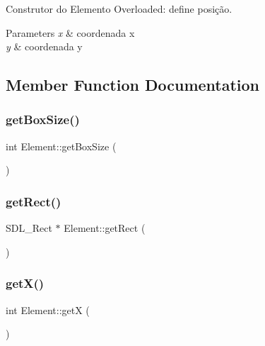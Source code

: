 Construtor do Elemento Overloaded\+: define posição. 


\begin{DoxyParams}{Parameters}
{\em x} & coordenada x \\
\hline
{\em y} & coordenada y \\
\hline
\end{DoxyParams}


\subsection{Member Function Documentation}
\mbox{\label{classElement_a9bb602a1a56055ea4b360b1a5486ff24}} 
\subsubsection{\texorpdfstring{get\+Box\+Size()}{getBoxSize()}}
{\footnotesize\ttfamily int Element\+::get\+Box\+Size (\begin{DoxyParamCaption}{ }\end{DoxyParamCaption})}

\mbox{\label{classElement_ac8e7a2a1670e95335b6924b873600ea3}} 
\subsubsection{\texorpdfstring{get\+Rect()}{getRect()}}
{\footnotesize\ttfamily S\+D\+L\+\_\+\+Rect $\ast$ Element\+::get\+Rect (\begin{DoxyParamCaption}{ }\end{DoxyParamCaption})}

\mbox{\label{classElement_ab5e2530eac11f0281769e6689856ceb2}} 
\subsubsection{\texorpdfstring{get\+X()}{getX()}}
{\footnotesize\ttfamily int Element\+::getX (\begin{DoxyParamCaption}{ }\end{DoxyParamCaption})}

